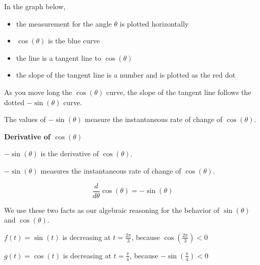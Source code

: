 \documentclass{ximera}
\begin{document}
In the graph below, 

\begin{itemize}
\item the measurement for the angle $\theta$ is plotted horizontally
\item $\cos(\theta)$ is the blue curve
\item the line is a tangent line to $\cos(\theta)$
\item the slope of the tangent line is a number and is plotted as the red dot
\end{itemize}

As you move long the $\cos(\theta)$ curve, the slope of the tangent line follows the dotted $-\sin(\theta)$ curve.



\begin{center}
\end{center}



The values of $-\sin(\theta)$ measure the instantaneous rate of change of $\cos(\theta)$.



\begin{theorem}  \textbf{\textcolor{green!50!black}{Derivative of $\cos(\theta)$}}

\begin{center}
$-\sin(\theta)$ is the derivative of $\cos(\theta)$. 

$-\sin(\theta)$ measures the instantaneous rate of change of $\cos(\theta)$. 
\end{center}


\[
\frac{d}{d\theta} \cos(\theta) = -\sin(\theta)
\]


\end{theorem}







We use these two facts as our algebraic reasoning for the behavior of $\sin(\theta)$ and $\cos(\theta)$.




\begin{example}



$f(t) = \sin(t)$ is decreasing at $t=\frac{2\pi}{3}$, because $\cos\left( \frac{2\pi}{3} \right) < 0$ 


$g(t) = \cos(t)$ is decreasing at $t=\frac{\pi}{4}$, because $-\sin\left( \frac{\pi}{4} \right) < 0$

\end{example}
\end{document}

